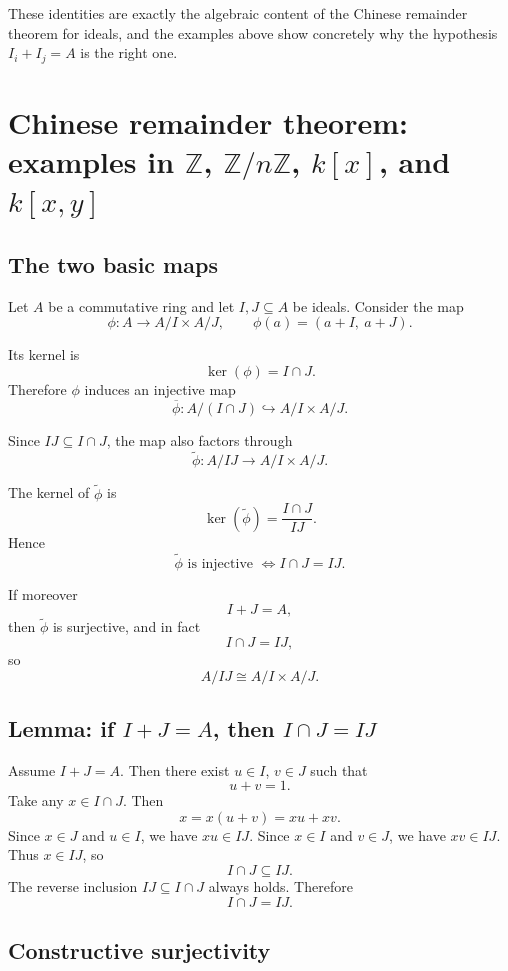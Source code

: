 \documentclass[12pt,a4paper]{article}
\theoremstyle{notespace}
\begin{document}
These identities are exactly the algebraic content of the Chinese remainder theorem for ideals, and the examples above show concretely why the hypothesis \(I_i+I_j=A\) is the right one.

\section{Chinese remainder theorem: examples in \(\mathbb Z\), \(\mathbb Z/n\mathbb Z\), \(k[x]\), and \(k[x,y]\)}

\subsection{The two basic maps}

Let \(A\) be a commutative ring and let \(I,J\subseteq A\) be ideals. Consider the map
\[
\phi:A\longrightarrow A/I\times A/J,
\qquad
\phi(a)=(a+I,\ a+J).
\]

Its kernel is
\[
\ker(\phi)=I\cap J.
\]
Therefore \(\phi\) induces an injective map
\[
\overline\phi:A/(I\cap J)\hookrightarrow A/I\times A/J.
\]

Since \(IJ\subseteq I\cap J\), the map also factors through
\[
\widetilde\phi:A/IJ\longrightarrow A/I\times A/J.
\]

The kernel of \(\widetilde\phi\) is
\[
\ker(\widetilde\phi)=\frac{I\cap J}{IJ}.
\]
Hence
\[
\widetilde\phi \text{ is injective } \Longleftrightarrow I\cap J=IJ.
\]

If moreover
\[
I+J=A,
\]
then \(\widetilde\phi\) is surjective, and in fact
\[
I\cap J=IJ,
\]
so
\[
A/IJ \cong A/I\times A/J.
\]

\subsection{Lemma: if \(I+J=A\), then \(I\cap J=IJ\)}

Assume \(I+J=A\). Then there exist \(u\in I\), \(v\in J\) such that
\[
u+v=1.
\]
Take any \(x\in I\cap J\). Then
\[
x=x(u+v)=xu+xv.
\]
Since \(x\in J\) and \(u\in I\), we have \(xu\in IJ\). Since \(x\in I\) and \(v\in J\), we have \(xv\in IJ\). Thus \(x\in IJ\), so
\[
I\cap J\subseteq IJ.
\]
The reverse inclusion \(IJ\subseteq I\cap J\) always holds. Therefore
\[
I\cap J=IJ.
\]

\subsection{Constructive surjectivity}
\end{document}
